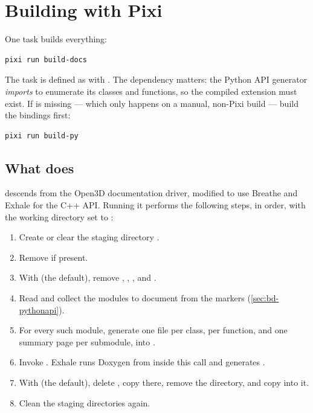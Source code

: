 \section{Building with Pixi}
\label{sec:bd-pixi}

One task builds everything:

\begin{lstlisting}[language=shell]
pixi run build-docs
\end{lstlisting}

The task is defined as  with
. The dependency matters: the Python API
generator \emph{imports} \pylupnt{} to enumerate its classes and functions, so
the compiled extension must exist. If  is
missing --- which only happens on a manual, non-Pixi build --- build the
bindings first:

\begin{lstlisting}[language=shell]
pixi run build-py
\end{lstlisting}

\subsection{What  does}
\label{sec:bd-makedocs}

 descends from the Open3D documentation driver,
modified to use Breathe and Exhale for the C++ API. Running it performs the
following steps, in order, with the working directory set to :

\begin{enumerate}[leftmargin=1.6em]
  \item Create or clear the staging directory .
  \item Remove  if present.
  \item With  (the default), remove ,
    , , and .
  \item Read  and collect the modules to document from the
     markers (\cref{sec:bd-pythonapi}).
  \item For every such module, generate one  file per class, per
    function, and one summary page per submodule, into .
  \item Invoke . Exhale runs
    Doxygen from inside this call and generates .
  \item With  (the default), delete , copy
     there, remove the  directory, and
    copy  into it.
  \item Clean the staging directories again.
\end{enumerate}

